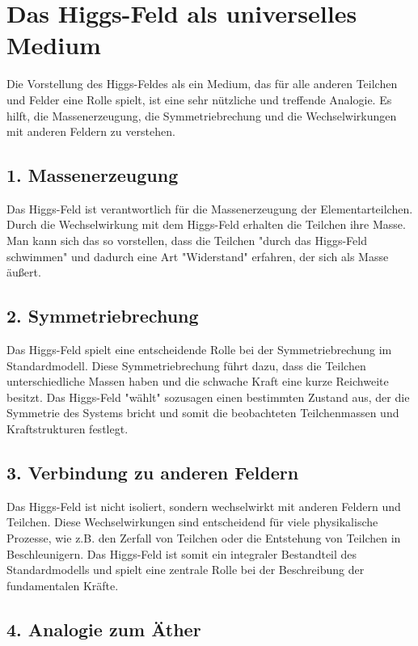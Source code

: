 \documentclass{article}
\begin{document}
	\section{Das Higgs-Feld als universelles Medium}
	
	Die Vorstellung des Higgs-Feldes als ein Medium, das für alle anderen Teilchen und Felder eine Rolle spielt, ist eine sehr nützliche und treffende Analogie. Es hilft, die Massenerzeugung, die Symmetriebrechung und die Wechselwirkungen mit anderen Feldern zu verstehen.
	
	\subsection{1. Massenerzeugung}
	
	Das Higgs-Feld ist verantwortlich für die Massenerzeugung der Elementarteilchen. Durch die Wechselwirkung mit dem Higgs-Feld erhalten die Teilchen ihre Masse. Man kann sich das so vorstellen, dass die Teilchen "durch das Higgs-Feld schwimmen" und dadurch eine Art "Widerstand" erfahren, der sich als Masse äußert.
	
	\subsection{2. Symmetriebrechung}
	
	Das Higgs-Feld spielt eine entscheidende Rolle bei der Symmetriebrechung im Standardmodell. Diese Symmetriebrechung führt dazu, dass die Teilchen unterschiedliche Massen haben und die schwache Kraft eine kurze Reichweite besitzt. Das Higgs-Feld "wählt" sozusagen einen bestimmten Zustand aus, der die Symmetrie des Systems bricht und somit die beobachteten Teilchenmassen und Kraftstrukturen festlegt.
	
	\subsection{3. Verbindung zu anderen Feldern}
	
	Das Higgs-Feld ist nicht isoliert, sondern wechselwirkt mit anderen Feldern und Teilchen. Diese Wechselwirkungen sind entscheidend für viele physikalische Prozesse, wie z.B. den Zerfall von Teilchen oder die Entstehung von Teilchen in Beschleunigern. Das Higgs-Feld ist somit ein integraler Bestandteil des Standardmodells und spielt eine zentrale Rolle bei der Beschreibung der fundamentalen Kräfte.
	
	\subsection{4. Analogie zum Äther}
	
\end{document}
